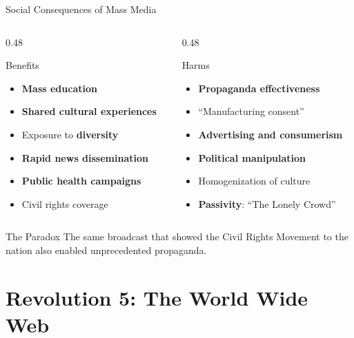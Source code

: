 \documentclass[aspectratio=169]{beamer}
\begin{document}
\begin{frame}{Social Consequences of Mass Media}
\begin{columns}
\begin{column}{0.48\textwidth}
\begin{block}{\faThumbsUp\hspace{0.3em}Benefits}
\begin{itemize}
  \item \textbf{Mass education}
  \item \textbf{Shared cultural experiences}
  \item Exposure to \textbf{diversity}
  \item \textbf{Rapid news dissemination}
  \item \textbf{Public health campaigns}
  \item Civil rights coverage
\end{itemize}
\end{block}
\end{column}

\begin{column}{0.48\textwidth}
\begin{alertblock}{\faThumbsDown\hspace{0.3em}Harms}
\begin{itemize}
  \item \textbf{Propaganda effectiveness}
  \item ``Manufacturing consent''
  \item \textbf{Advertising and consumerism}
  \item \textbf{Political manipulation}
  \item Homogenization of culture
  \item \textbf{Passivity}: ``The Lonely Crowd''
\end{itemize}
\end{alertblock}
\end{column}
\end{columns}

\vspace{0.5em}
\begin{exampleblock}{The Paradox}
The same broadcast that showed the Civil Rights Movement to the nation also enabled unprecedented propaganda.
\end{exampleblock}
\end{frame}


\section{Revolution 5: The World Wide Web}
\end{document}
